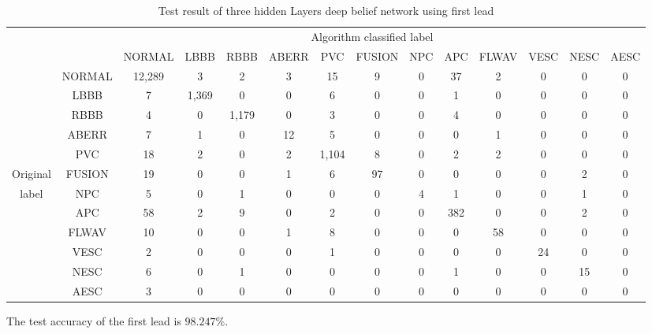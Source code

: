 \documentclass[conference]{IEEEtran}
\begin{document}
\begin{table}[t]
\begin{center}
\begin{lrbox}{\tablebox}
\begin{threeparttable}
\caption{Test result of three hidden Layers deep belief network using first lead}
\label{table2}
\small
\begin{tabular}{cccccccccccccc}
\hline
\multicolumn{9}{r}{Algorithm classified label} \\
\cline{3-14}
		 &      & NORMAL & LBBB & RBBB & ABERR & PVC & FUSION & NPC & APC & FLWAV & VESC & NESC & AESC\\
\hline
 		 & NORMAL & 12,289& 3   &  2   &  3   &  15  &  9    &	0   &  37 &   2   &   0  &  0  &  0 \\
	     & LBBB   &  7    & 1,369&  0  &  0   &  6   &  0    &  0   &  1  &   0   &   0  &  0  &  0 \\
		 & RBBB   &  4    &  0  & 1,179&  0   &  3   &  0    &	0   &  4  &   0   &   0  &  0  &  0 \\
		 & ABERR  &  7    &  1  &  0   &  12  &  5   &  0    &	0   &  0  &   1   &   0  &  0  &  0 \\
		 & PVC    &  18   &  2  &  0   &  2   & 1,104&  8    &	0   &  2  &   2   &   0  &  0  &  0 \\
Original & FUSION &	 19   &  0  &  0   &  1   &  6   &   97  &	0   &  0  &   0   &   0  &  2  &  0 \\
label    & NPC    &	 5    &  0  &  1   &  0   &  0   &  0    &	4   &  1  &   0   &   0  &  1  &  0 \\
		 & APC    &	 58   &  2  &  9   &  0   &  2   &  0    &	0   &  382&   0   &   0  &  2  &  0 \\
		 & FLWAV  &	 10   &  0  &  0   &  1   &  8   &  0    &	0   &  0  &   58  &   0  &  0  &  0 \\
		 & VESC   &	 2    &  0  &  0   &  0   &  1   &  0    &	0   &  0  &   0   &  24  &  0  &  0 \\
		 & NESC   &	 6    &  0  &  1   &  0   &  0   &  0    &	0   &  1  &   0   &   0  &  15 &  0 \\
		 & AESC   &	 3    &  0  &  0   &  0   &  0   &  0    &	0   &  0  &   0   &   0  &  0  &  0 \\
\hline
\end{tabular}
\begin{tablenotes}
\item The test accuracy of the first lead is $98.247\%$.
\end{tablenotes}
\end{threeparttable}
\end{lrbox}
\scalebox{0.96}{\usebox{\tablebox}}
\end{center}
\end{table}
\end{document}
